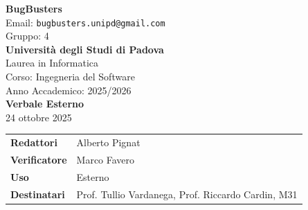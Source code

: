 \documentclass[a4paper,12pt]{article}
\begin{document}
\begin{center}  
  
  {\Large\bfseries\color{primaryblue} BugBusters}\\[0.3cm]
  {\small\color{darkgray} Email: \texttt{bugbusters.unipd@gmail.com}} \\[0.1cm]
  {\small\color{darkgray} Gruppo: 4} \\[0.5cm]

  {\large\bfseries Università degli Studi di Padova}\\[0.3cm]
  {\small Laurea in Informatica}\\[0.2cm]
  {\small Corso: Ingegneria del Software}\\[0.2cm]
  {\small Anno Accademico: 2025/2026}\\[0.8cm]

  {\Huge\bfseries\color{primaryblue} Verbale Esterno}\\[0.3cm]
  {\Large\color{secondaryblue} 24 ottobre 2025}\\[0.8cm]
\end{center}

\begin{center}
\begin{tcolorbox}[colback=lightgray,colframe=primaryblue,width=0.85\textwidth,arc=3mm,boxrule=0.5pt]
\begin{tabularx}{\linewidth}{@{}lX@{}}
\textbf{Redattori}   & Alberto Pignat\\
\textbf{Verificatore} & Marco Favero\\
\textbf{Uso}          & Esterno\\
\textbf{Destinatari}  & Prof. Tullio Vardanega, Prof. Riccardo Cardin, M31\\
\end{tabularx}
\end{tcolorbox}
\end{center}
\end{document}
